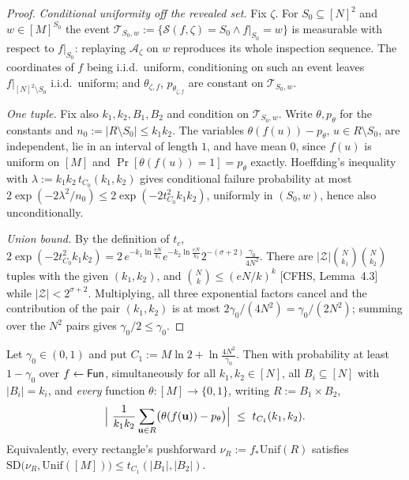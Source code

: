 \documentclass{aicr-solution}
\newcommand{\Fun}{\mathsf{Fun}}
\newcommand{\Prob}[1]{\Pr\!\left[#1\right]}
\newcommand{\bits}{\{0,1\}}
\newcommand{\vu}{\mathbf{u}}
\newcommand{\Unif}{\mathrm{Unif}}
\begin{document}
\begin{proof}
\emph{Conditional uniformity off the revealed set.} Fix $\zeta$. For
$S_0\subseteq[N]^{2}$ and $w\in[M]^{S_0}$ the event
$\mathcal T_{S_0,w}:=\{\mathcal S(f,\zeta)=S_0\wedge f|_{S_0}=w\}$ is measurable
with respect to $f|_{S_0}$: replaying $\mathcal A_\zeta$ on $w$ reproduces its
whole inspection sequence. The coordinates of $f$ being i.i.d.\ uniform,
conditioning on such an event leaves $f|_{[N]^{2}\setminus S_0}$ i.i.d.\ uniform;
and $\theta_{\zeta,f}$, $p_{\theta_{\zeta,f}}$ are constant on
$\mathcal T_{S_0,w}$.

\emph{One tuple.} Fix also $k_1,k_2,B_1,B_2$ and condition on
$\mathcal T_{S_0,w}$. Write $\theta,p_\theta$ for the constants and
$n_0:=|R\setminus S_0|\le k_1k_2$. The variables $\theta(f(u))-p_\theta$,
$u\in R\setminus S_0$, are independent, lie in an interval of length $1$, and have
mean $0$, since $f(u)$ is uniform on $[M]$ and
$\Prob{\theta(f(u))=1}=p_\theta$ exactly. Hoeffding's inequality with
$\lambda:=k_1k_2\,t_{C_0}(k_1,k_2)$ gives conditional failure probability at most
$2\exp(-2\lambda^{2}/n_0)\le2\exp(-2t_{C_0}^{2}k_1k_2)$, uniformly in $(S_0,w)$,
hence also unconditionally.

\emph{Union bound.} By the definition of $t_c$,
$2\exp(-2t_{C_0}^{2}k_1k_2)=2\,e^{-k_1\ln\frac{eN}{k_1}}e^{-k_2\ln\frac{eN}{k_2}}2^{-(\sigma+2)}\frac{\gamma_0}{4N^{2}}$.
There are $|\mathcal Z|\binom{N}{k_1}\binom{N}{k_2}$ tuples with the given
$(k_1,k_2)$, and $\binom{N}{k}\le(eN/k)^{k}$ [CFHS, Lemma~4.3] while
$|\mathcal Z|<2^{\sigma+2}$. Multiplying, all three exponential factors cancel
and the contribution of the pair $(k_1,k_2)$ is at most
$2\gamma_0/(4N^{2})=\gamma_0/(2N^{2})$; summing over the $N^{2}$ pairs gives
$\gamma_0/2\le\gamma_0$.
\end{proof}

\begin{lemma}\label{lem:disc2}
Let $\gamma_0\in(0,1)$ and put $C_1:=M\ln2+\ln\frac{4N^{2}}{\gamma_0}$. Then with
probability at least $1-\gamma_0$ over $f\sample\Fun$, simultaneously for all
$k_1,k_2\in[N]$, all $B_i\subseteq[N]$ with $|B_i|=k_i$, and \emph{every} function
$\theta:[M]\to\bits$, writing $R:=B_1\times B_2$,
\[
  \Bigl|\ \frac{1}{k_1k_2}\sum_{\vu\in R}\bigl(\theta(f(\vu))-p_\theta\bigr)\Bigr|
  \ \le\ t_{C_1}(k_1,k_2).
\]
Equivalently, every rectangle's pushforward $\nu_R:=f_{*}\Unif(R)$ satisfies
$\mathrm{SD}\bigl(\nu_R,\Unif([M])\bigr)\le t_{C_1}(|B_1|,|B_2|)$.
\end{lemma}
\end{document}
